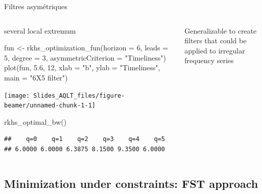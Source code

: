 \documentclass[10pt,xcolor=table,color={dvipsnames,usenames},ignorenonframetext,usepdftitle=false,english]{beamer}
\newenvironment{Shaded}{\begin{snugshade}}{\end{snugshade}}
\newcommand{\AttributeTok}[1]{\textcolor[rgb]{0.77,0.63,0.00}{#1}}
\newcommand{\DecValTok}[1]{\textcolor[rgb]{0.00,0.00,0.81}{#1}}
\newcommand{\FloatTok}[1]{\textcolor[rgb]{0.00,0.00,0.81}{#1}}
\newcommand{\FunctionTok}[1]{\textcolor[rgb]{0.00,0.00,0.00}{#1}}
\newcommand{\NormalTok}[1]{#1}
\newcommand{\OtherTok}[1]{\textcolor[rgb]{0.56,0.35,0.01}{#1}}
\newcommand{\StringTok}[1]{\textcolor[rgb]{0.31,0.60,0.02}{#1}}
\newcommand\1{\mathds{1}}
\begin{document}
\begin{frame}[fragile]{Filtres asymétriques}
\protect\hypertarget{filtres-asymuxe9triques}{}
\begin{columns}[T]
\begin{column}{0.65\textwidth}
\bcsmmh several local extremum

\footnotesize

\begin{Shaded}
\begin{Highlighting}[]
\NormalTok{fun }\OtherTok{\textless{}{-}} \FunctionTok{rkhs\_optimization\_fun}\NormalTok{(}\AttributeTok{horizon =} \DecValTok{6}\NormalTok{, }
            \AttributeTok{leads =} \DecValTok{5}\NormalTok{, }\AttributeTok{degree =} \DecValTok{3}\NormalTok{, }
            \AttributeTok{asymmetricCriterion =} \StringTok{"Timeliness"}\NormalTok{)}
\FunctionTok{plot}\NormalTok{(fun, }\FloatTok{5.6}\NormalTok{, }\DecValTok{12}\NormalTok{, }\AttributeTok{xlab =} \StringTok{"b"}\NormalTok{, }
     \AttributeTok{ylab =} \StringTok{"Timeliness"}\NormalTok{, }\AttributeTok{main =} \StringTok{"6X5 filter"}\NormalTok{)}
\end{Highlighting}
\end{Shaded}

\begin{center}\texttt{[image: Slides\_AQLT\_files/figure-beamer/unnamed-chunk-1-1]} \end{center}

\begin{Shaded}
\begin{Highlighting}[]
\FunctionTok{rkhs\_optimal\_bw}\NormalTok{()}
\end{Highlighting}
\end{Shaded}

\begin{verbatim}
##    q=0    q=1    q=2    q=3    q=4    q=5 
## 6.0000 6.0000 6.3875 8.1500 9.3500 6.0000
\end{verbatim}
\end{column}

\begin{column}{0.3\textwidth}
\bigskip

\bcsmbh Generalizable to create filters that could be applied to
irregular frequency series
\end{column}
\end{columns}
\end{frame}

\hypertarget{minimization-under-constraints-fst-approach}{%
\subsection{Minimization under constraints: FST
approach}\label{minimization-under-constraints-fst-approach}}
\end{document}
